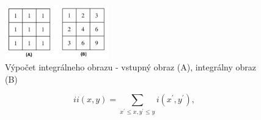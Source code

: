 \documentclass[slovak,master,dept460,male,cpp,cpdeclaration]{diploma}
\begin{document}
\begin{figure}[H]
	\centering
	\includegraphics[width=0.4\textwidth]{Figures/integralImage.png}
	\caption{Výpočet integrálneho obrazu - vstupný obraz (A), integrálny obraz (B)}
	\label{fig:integralImage}
\end{figure}


\begin{equation}
ii(x,y)=\sum_{x^{\prime}\leq x,y^{\prime}\leq y}i(x^{\prime},y^{\prime}),
\label{eq:integral}
\end{equation}
\end{document}
